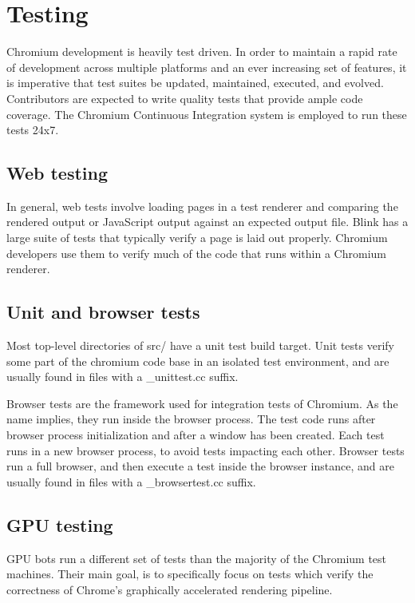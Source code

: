 \section{Testing}

Chromium development is heavily test driven. In order to maintain a rapid rate of development across multiple platforms and an ever increasing set of features, it is imperative that test suites be updated, maintained, executed, and evolved. Contributors are expected to write quality tests that provide ample code coverage. The Chromium Continuous Integration system is employed to run these tests 24x7. 

\subsection{Web testing}

In general, web tests involve loading pages in a test renderer and comparing the rendered output or JavaScript output against an expected output file. Blink has a large suite of tests that typically verify a page is laid out properly.  Chromium developers use them to verify much of the code that runs within a Chromium renderer.

\subsection{Unit and browser tests}

Most top-level directories of src/ have a unit test build target. Unit tests verify some part of the chromium code base in an isolated test environment, and are usually found in files with a \_unittest.cc suffix. 

Browser tests are the framework used for integration tests of Chromium. As the name implies, they run inside the browser process. The test code runs after browser process initialization and after a window has been created. Each test runs in a new browser process, to avoid tests impacting each other.
Browser tests run a full browser, and then execute a test inside the browser instance, and are usually found in files with a \_browsertest.cc suffix. 

\subsection{GPU testing}

GPU bots run a different set of tests than the majority of the Chromium test machines. Their main goal, is to specifically focus on tests which verify the correctness of Chrome's graphically accelerated rendering pipeline.

